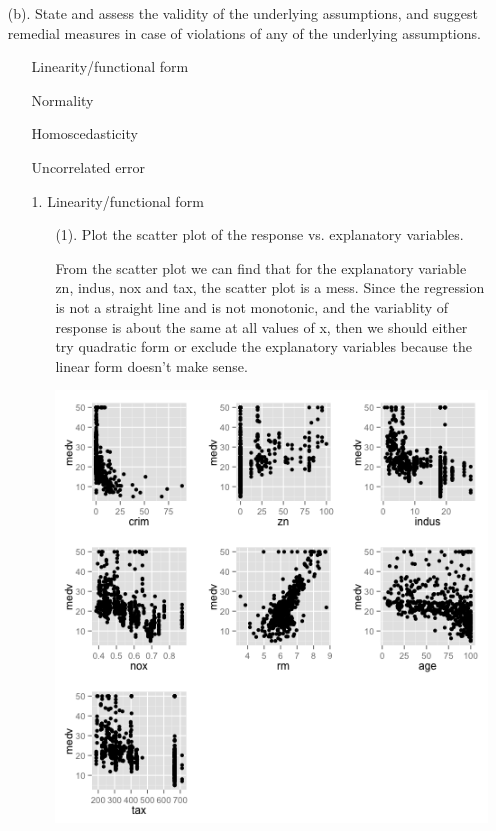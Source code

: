 \documentclass[10pt,letterpaper]{article}
\begin{document}
\begin{enumerate}[leftmargin=0cm,itemindent=.5cm,labelwidth=\itemindent,labelsep=0cm,align=left]
\item[(b). ] State and assess the validity of the underlying assumptions, and suggest remedial measures in case of violations of any of the underlying assumptions.\\
\begin{enumerate}[leftmargin=0cm,itemindent=.5cm,labelwidth=\itemindent,labelsep=0cm,align=left]
\item[\textbullet]Linearity/functional form 
\item[\textbullet]Normality 
\item[\textbullet]Homoscedasticity 
\item[\textbullet]Uncorrelated error
\end{enumerate}

\begin{enumerate}[leftmargin=0cm,itemindent=.5cm,labelwidth=\itemindent,labelsep=0cm,align=left]
\item[1.] Linearity/functional form
\begin{enumerate}[leftmargin=0cm,itemindent=.5cm,labelwidth=\itemindent,labelsep=0cm,align=left]
\item[(1). ] Plot the scatter plot of the response vs. explanatory variables. 

From the scatter plot we can find that for the explanatory variable zn, indus, nox and tax, the scatter plot is a mess. Since the regression is not a straight line and is not monotonic, and the variablity of response is about the same at all values of x,  then we should either try quadratic form or exclude the explanatory variables because the linear form doesn't make sense.\\
\begin{center}
\includegraphics[scale=0.8]{scatter1}
\end{center}
 

\end{enumerate}
\end{enumerate}
\end{enumerate}
\end{document}
